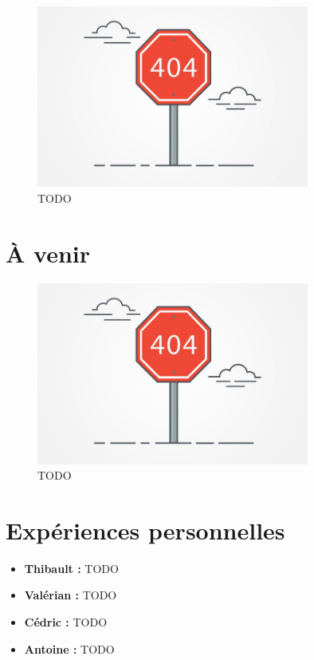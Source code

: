 \documentclass[12pt]{report}
\begin{document}
\begin{figure}[H]
    \centering
    \includegraphics[width=0.8\textwidth]{404}
    \caption{TODO}
\end{figure}

\chapter{À venir}

\begin{figure}[H]
    \centering
    \includegraphics[width=0.8\textwidth]{404}
    \caption{TODO}
\end{figure}

\chapter{Expériences personnelles}

\begin{itemize}
	\item \textbf{Thibault :} TODO
        \item \textbf{Valérian :} TODO
	\item \textbf{Cédric :} TODO
	\item \textbf{Antoine :} TODO
\end{itemize}
\end{document}
